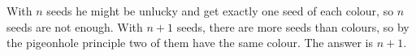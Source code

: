 With $n$ seeds he might be unlucky and get exactly one seed of each colour, so $n$ seeds are not enough. With $n+1$ seeds, there are more seeds than colours, so by the pigeonhole principle two of them have the same colour. The answer is $\boxed{n+1}$.
